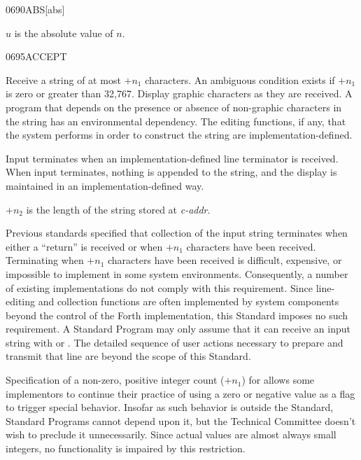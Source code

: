 \begin{newword}{0690}{ABS}[abs]

	$u$ is the absolute value of $n$.
\end{newword}


\begin{newword}{0695}{ACCEPT}

	Receive a string of at most $+n_1$ characters. An ambiguous
	condition exists if $+n_1$ is zero or greater than 32,767.
	Display graphic characters as they are received. A program that
	depends on the presence or absence of non-graphic characters in
	the string has an environmental dependency. The editing
	functions, if any, that the system performs in order to
	construct the string are implementation-defined.

	Input terminates when an implementation-defined line terminator
	is received. When input terminates, nothing is appended to the
	string, and the display is maintained in an
	implementation-defined way.

	$+n_2$ is the length of the string stored at \emph{c-addr}.

	\begin{rationale} %
		Previous standards specified that collection of the input
		string terminates when either a ``return'' is received or when
		$+n_1$ characters have been received. Terminating when $+n_1$
		characters have been received is difficult, expensive, or
		impossible to implement in some system environments.
		Consequently, a number of existing implementations do not
		comply with this requirement. Since line-editing and collection
		functions are often implemented by system components beyond the
		control of the Forth implementation, this Standard imposes no
		such requirement. A Standard Program may only assume that it
		can receive an input string with  or .
		The detailed sequence of user actions necessary to prepare and
		transmit that line are beyond the scope of this Standard.

		Specification of a non-zero, positive integer count ($+n_1$)
		for  allows some implementors to continue their
		practice of using a zero or negative value as a flag to trigger
		special behavior. Insofar as such behavior is outside the
		Standard, Standard Programs cannot depend upon it, but the
		Technical Committee doesn't wish to preclude it unnecessarily.
		Since actual values are almost always small integers, no
		functionality is impaired by this restriction.


\end{rationale}
\end{newword}
